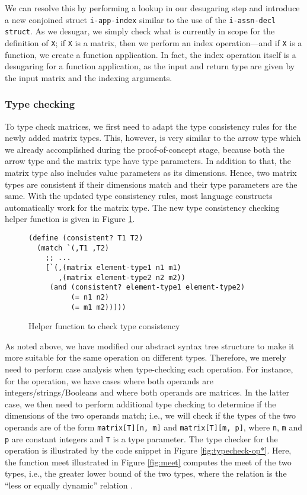 We can resolve this by performing a lookup in our desugaring step and introduce a new conjoined struct {\tt i-app-index} similar to the use of the {\tt i-assn-decl struct}. As we desugar, we simply check what is currently in scope for the definition of {\tt X}; if {\tt X} is a matrix, then we perform an index operation---and if {\tt X} is a function, we create a function application. In fact, the index operation itself is a desugaring for a function application, as the input and return type are given by the input matrix and the indexing arguments.

\subsubsection{Type checking}

To type check matrices, we first need to adapt the type consistency rules for the newly added matrix types. This, however, is very similar to the arrow type which we already accomplished during the proof-of-concept stage, because both the arrow type and the matrix type have type parameters. In addition to that, the matrix type also includes value parameters as its dimensions. Hence, two matrix types are consistent if their dimensions match and their type parameters are the same. With the updated type consistency rules, most language constructs automatically work for the matrix type. The new type consistency checking helper function is given in Figure \ref{fig:typeconsistency}.

\begin{figure}[h]
    \begin{lstlisting}[language=racket]
(define (consistent? T1 T2)
  (match `(,T1 ,T2)
    ;; ...
    [`(,(matrix element-type1 n1 m1)
       ,(matrix element-type2 n2 m2))
     (and (consistent? element-type1 element-type2)
          (= n1 n2)
          (= m1 m2))]))
    \end{lstlisting}
    \caption[]{Helper function to check type consistency}
    \label{fig:typeconsistency}
\end{figure}

As noted above, we have modified our abstract syntax tree structure to make it more suitable for the same operation on different types. Therefore, we merely need to perform case analysis when type-checking each operation. For instance, for the {\tt *} operation, we have cases where both operands are integers/strings/Booleans and where both operands are matrices. In the latter case, we then need to perform additional type checking to determine if the dimensions of the two operands match; i.e., we will check if the types of the two operands are of the form {\tt matrix[T][n, m]} and {\tt matrix[T][m, p]}, where {\tt n}, {\tt m} and {\tt p} are constant integers and {\tt T} is a type parameter. The type checker for the {\tt *} operation is illustrated by the code snippet in Figure \ref{fig:typecheck-op*}. Here, the function meet illustrated in Figure \ref{fig:meet} computes the meet of the two types, i.e., the greater lower bound of the two types, where the relation is the ``less or equally dynamic'' relation \cite{siek2012interpretations}.
 
